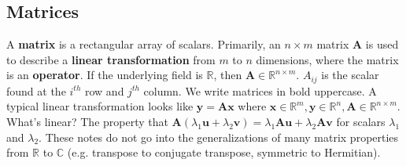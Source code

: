 \documentclass{harvardml}
\theoremstyle{definition}
\theoremstyle{plain}
\newcommand{\R}{\mathbb{R}}
\newcommand{\C}{\mathbb{C}}
\begin{document}
    \subsection{Matrices}
		A \textbf{matrix} is a rectangular array of scalars.
		Primarily, an $n \times m$ matrix $\mathbf{A}$ is used to 
		describe a \textbf{linear transformation} from $m$ to $n$ 
		dimensions, where the matrix is an \textbf{operator}. If the 
		underlying field is $\R$, then $\mathbf{A} \in \R^{n \times m}$. 
		$A_{ij}$ is the scalar found at the $i^{th}$ row and $j^{th}$
		column. We write matrices in bold uppercase.
        A typical linear transformation looks like
            $\mathbf{y} = \mathbf{Ax}$ where $\mathbf{x} \in \R^m,
               \mathbf{y} \in \R^n, \mathbf{A} \in \R^{n \times m}$.
            What's linear? The property that $\mathbf{A}(\lambda_1\mathbf{u} 
			+ \lambda_2\mathbf{v}) = \lambda_1\mathbf{Au} +
            \lambda_2\mathbf{Av}$ for scalars $\lambda_1$ and $\lambda_2$.
			These notes do not go into the generalizations
			of many matrix properties from $\R$ to $\C$ 
			(e.g. transpose to conjugate transpose, symmetric to Hermitian).
\end{document}
